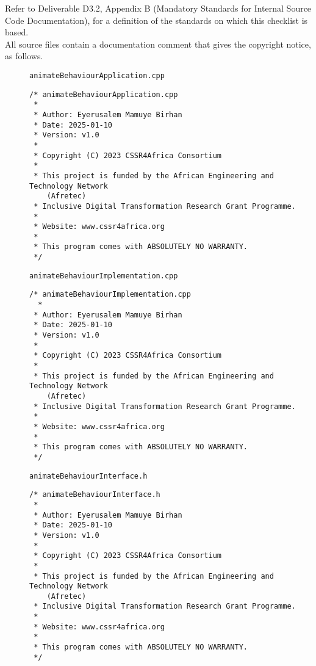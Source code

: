 \documentclass{CSSRforAfrica}
\newcommand{\blank}{~\\}
\newcommand{\checkboxChecked}{\fbox{\ding{51}}} %
\begin{document}
Refer to Deliverable D3.2, Appendix B (Mandatory Standards for Internal Source Code Documentation), for a definition of the standards on which this checklist is based.\\

\noindent All source files contain a documentation comment that gives the copyright notice, as follows.
 
\begin{description}

\item[\checkboxChecked] {\small \verb+animateBehaviourApplication.cpp+}  
{\small \begin{verbatim}
/* animateBehaviourApplication.cpp
 *
 * Author: Eyerusalem Mamuye Birhan
 * Date: 2025-01-10
 * Version: v1.0
 * 
 * Copyright (C) 2023 CSSR4Africa Consortium
 * 
 * This project is funded by the African Engineering and Technology Network 
    (Afretec) 
 * Inclusive Digital Transformation Research Grant Programme. 
 *
 * Website: www.cssr4africa.org
 *
 * This program comes with ABSOLUTELY NO WARRANTY.
 */
\end{verbatim} }

\item[\checkboxChecked]  {\small \verb+animateBehaviourImplementation.cpp+}  
{\small \begin{verbatim}
/* animateBehaviourImplementation.cpp
  *
 * Author: Eyerusalem Mamuye Birhan
 * Date: 2025-01-10
 * Version: v1.0
 * 
 * Copyright (C) 2023 CSSR4Africa Consortium
 * 
 * This project is funded by the African Engineering and Technology Network 
    (Afretec) 
 * Inclusive Digital Transformation Research Grant Programme. 
 *
 * Website: www.cssr4africa.org
 *
 * This program comes with ABSOLUTELY NO WARRANTY.
 */
\end{verbatim} }

\newpage
\item[\checkboxChecked] {\small \verb+animateBehaviourInterface.h+}   
{\small \begin{verbatim}
/* animateBehaviourInterface.h
 *
 * Author: Eyerusalem Mamuye Birhan
 * Date: 2025-01-10
 * Version: v1.0
 * 
 * Copyright (C) 2023 CSSR4Africa Consortium
 * 
 * This project is funded by the African Engineering and Technology Network 
    (Afretec) 
 * Inclusive Digital Transformation Research Grant Programme. 
 *
 * Website: www.cssr4africa.org
 *
 * This program comes with ABSOLUTELY NO WARRANTY.
 */
\end{verbatim} }

\end{description} 
\end{document}
